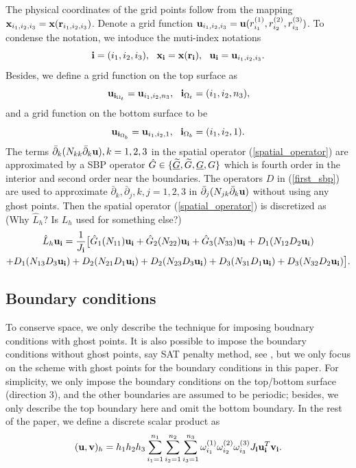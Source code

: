 \documentclass[a4paper]{article}
\newcommand{\wt}{\widetilde}
\begin{document}
The physical coordinates of the grid points follow from the mapping ${\bf x}_{i_1,i_2,i_3} = {\bf x}({\bf r}_{i_1,i_2,i_3})$. Denote a grid function ${\bf u}_{i_1,i_2,i_3} = {\bf u}(r_{i_1}^{(1)},r_{i_2}^{(2)},r_{i_3}^{(3)})$. To condense the notation, we intoduce the muti-index notations
\[{\bf i} = (i_1,i_2,i_3),\ \ {\bf x}_{\bf i} = {\bf x}({\bf r}_{\bf i}),\ \ {\bf u}_{\bf i} = {\bf u}_{i_1,i_2,i_3}.\]
Besides, we define a grid function on the top surface as
\[{\bf u}_{{\bf i}_{\Omega_t}} = {\bf u}_{i_1,i_2,n_3}, \ \ {\bf i}_{\Omega_t} = (i_1,i_2,n_3),\]
and a grid function on the bottom surface to be
\[{\bf u}_{{\bf i}_{\Omega_b}} = {\bf u}_{i_1,i_2,1}, \ \ {\bf i}_{\Omega_b} = (i_1,i_2,1).\]
The terms $\bar{\partial}_k(N_{kk}\bar{\partial}_k{\bf u}), k = 1,2,3$ in the spatial operator (\ref{spatial_operator}) are approximated by a SBP operator $\hat{G}\in\{\uline{\wt G}, \wt{G}, \uline{G}, G\}$ which is fourth order in the interior and  second order near the boundaries. The operators $D$ in  (\ref{first_sbp}) are used to approximate  $\bar{\partial}_k, \bar{\partial}_j, k,j = 1,2,3$ in $\bar{\partial}_j(N_{jk}\bar{\partial}_k{\bf u})$ without using any ghost points. Then the spatial operator (\ref{spatial_operator}) is discretized as {\color{red} (Why $\hat{ L}_h$? Is $L_h$ used for something else?)}
\begin{multline}\label{discrete_elastic}
\hat{ L}_h{\bf u}_{\bf i} = \frac{1}{J_{\bf i}}\big[\hat{G}_1(N_{11}){\bf u}_{\bf i}+\hat{G}_2(N_{22}){\bf u}_{\bf i}+\hat{G}_3(N_{33}){\bf u}_{\bf i}+D_1(N_{12}D_2{\bf u}_{\bf i})\\
+D_1(N_{13}D_3{\bf u}_{\bf i})+D_2(N_{21}D_1{\bf u}_{\bf i})+D_2(N_{23}D_3{\bf u}_{\bf i})+D_3(N_{31}D_1{\bf u}_{\bf i})
+D_3(N_{32}D_2{\bf u}_{\bf i})\big].
\end{multline}
 
\subsection{Boundary conditions}\label{boundary_conditions}
To conserve space, we only describe the technique for imposing boudnary conditions with ghost points. It is also possible to impose the boundary conditions without ghost points, say SAT penalty method, see \cite{?}, but we only focus on the scheme with ghost points for the boundary conditions in this paper. For simplicity, we only impose the boundary conditions on the top/bottom surface (direction $3$), and the other boundaries are assumed to be periodic; besides, we only describe the top boundary here and omit the bottom boundary. In the rest of the paper, we define a discrete scalar product as
\begin{equation}\label{scalar_product_discrete_interior}
({\bf u}, {\bf v})_h = h_1h_2h_3\sum_{i_1=1}^{n_1}\sum_{i_2=1}^{n_2}\sum_{i_3=1}^{n_3}\omega_{i_1}^{(1)}\omega_{i_2}^{(2)}\omega_{i_3}^{(3)}J_{\bf i}{\bf u}^{T}_{\bf i}{\bf v}_{\bf i}.
\end{equation}
\end{document}
